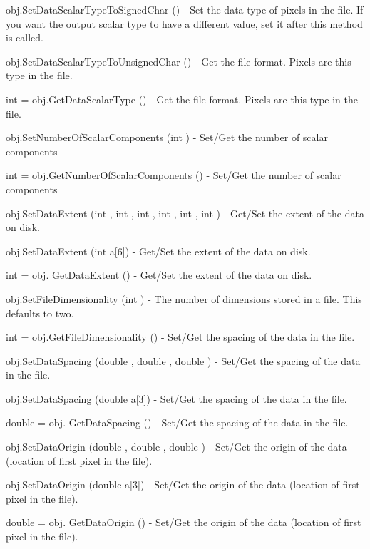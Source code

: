 \begin{DoxyItemize}
\item {\ttfamily obj.\-Set\-Data\-Scalar\-Type\-To\-Signed\-Char ()} -\/ Set the data type of pixels in the file. If you want the output scalar type to have a different value, set it after this method is called.  
\item {\ttfamily obj.\-Set\-Data\-Scalar\-Type\-To\-Unsigned\-Char ()} -\/ Get the file format. Pixels are this type in the file.  
\item {\ttfamily int = obj.\-Get\-Data\-Scalar\-Type ()} -\/ Get the file format. Pixels are this type in the file.  
\item {\ttfamily obj.\-Set\-Number\-Of\-Scalar\-Components (int )} -\/ Set/\-Get the number of scalar components  
\item {\ttfamily int = obj.\-Get\-Number\-Of\-Scalar\-Components ()} -\/ Set/\-Get the number of scalar components  
\item {\ttfamily obj.\-Set\-Data\-Extent (int , int , int , int , int , int )} -\/ Get/\-Set the extent of the data on disk.  
\item {\ttfamily obj.\-Set\-Data\-Extent (int a\mbox{[}6\mbox{]})} -\/ Get/\-Set the extent of the data on disk.  
\item {\ttfamily int = obj. Get\-Data\-Extent ()} -\/ Get/\-Set the extent of the data on disk.  
\item {\ttfamily obj.\-Set\-File\-Dimensionality (int )} -\/ The number of dimensions stored in a file. This defaults to two.  
\item {\ttfamily int = obj.\-Get\-File\-Dimensionality ()} -\/ Set/\-Get the spacing of the data in the file.  
\item {\ttfamily obj.\-Set\-Data\-Spacing (double , double , double )} -\/ Set/\-Get the spacing of the data in the file.  
\item {\ttfamily obj.\-Set\-Data\-Spacing (double a\mbox{[}3\mbox{]})} -\/ Set/\-Get the spacing of the data in the file.  
\item {\ttfamily double = obj. Get\-Data\-Spacing ()} -\/ Set/\-Get the spacing of the data in the file.  
\item {\ttfamily obj.\-Set\-Data\-Origin (double , double , double )} -\/ Set/\-Get the origin of the data (location of first pixel in the file).  
\item {\ttfamily obj.\-Set\-Data\-Origin (double a\mbox{[}3\mbox{]})} -\/ Set/\-Get the origin of the data (location of first pixel in the file).  
\item {\ttfamily double = obj. Get\-Data\-Origin ()} -\/ Set/\-Get the origin of the data (location of first pixel in the file).  

\end{DoxyItemize}
